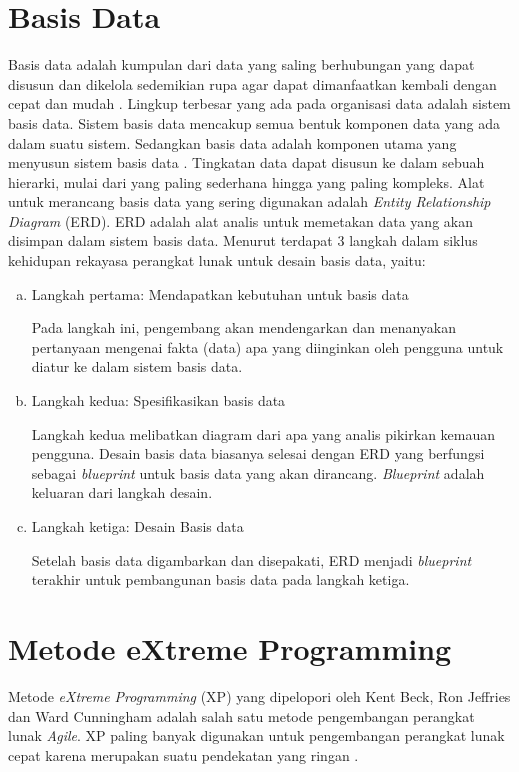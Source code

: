 \section{Basis Data}

Basis data adalah kumpulan dari data yang saling berhubungan yang dapat disusun dan dikelola sedemikian rupa agar dapat dimanfaatkan kembali dengan cepat dan mudah \citep{yanto2016}. Lingkup terbesar yang ada pada organisasi data adalah sistem basis data. Sistem basis data mencakup semua bentuk komponen data yang ada dalam suatu sistem. Sedangkan basis data adalah komponen utama yang menyusun sistem basis data \citep{pamungkas2017}. Tingkatan data dapat disusun ke dalam sebuah hierarki, mulai dari yang paling sederhana hingga yang paling kompleks. Alat untuk merancang basis data yang sering digunakan adalah \textit{Entity Relationship Diagram} (ERD). ERD adalah alat analis untuk memetakan data yang akan disimpan dalam sistem basis data. Menurut \citep{bagui2012} terdapat 3 langkah dalam siklus kehidupan rekayasa perangkat lunak untuk desain basis data, yaitu:
\begin{enumerate}[a.]
	\item Langkah pertama: Mendapatkan kebutuhan untuk basis data
	
	Pada langkah ini, pengembang akan mendengarkan dan menanyakan pertanyaan mengenai fakta (data) apa yang diinginkan oleh pengguna untuk diatur ke dalam sistem basis data.
	
	\item Langkah kedua: Spesifikasikan basis data
	
	Langkah kedua melibatkan diagram dari apa yang analis pikirkan kemauan pengguna. Desain basis data biasanya selesai dengan ERD yang berfungsi sebagai \textit{blueprint} untuk basis data yang akan dirancang. \textit{Blueprint} adalah keluaran dari langkah desain.
	
	\item Langkah ketiga: Desain Basis data
	
	Setelah basis data digambarkan dan disepakati, ERD menjadi \textit{blueprint} terakhir untuk pembangunan basis data pada langkah ketiga.
\end{enumerate}

\section{Metode eXtreme Programming}
Metode \textit{eXtreme Programming} (XP) yang dipelopori oleh Kent Beck, Ron Jeffries dan Ward Cunningham adalah salah satu metode pengembangan perangkat lunak \textit{Agile}. XP paling banyak digunakan untuk pengembangan perangkat lunak cepat karena merupakan suatu pendekatan yang ringan \citep{pressman2010}.
 
